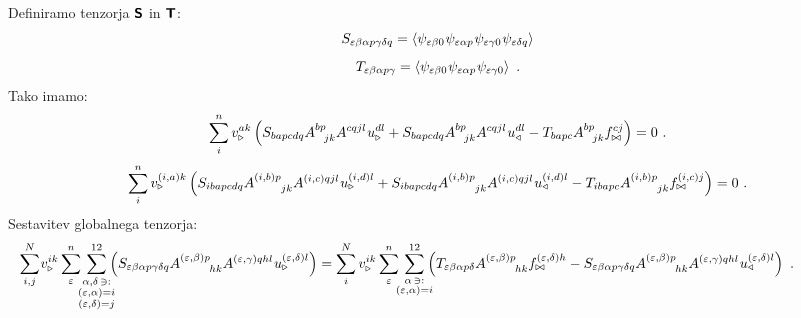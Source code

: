 Definiramo tenzorja $\bm{\mathsf{S}}$ in $\bm{\mathsf{T}}$:
\begin{equation}
   S_{\varepsilon \beta \alpha p \gamma \delta q} = \left\langle   \psi_{ \varepsilon \beta 0} \mkern1mu    \psi_{\varepsilon \alpha p} \mkern1mu    \psi_{\varepsilon \gamma 0} \mkern1mu    \psi_{\varepsilon \delta q}   \right\rangle
\end{equation}
\begin{equation}
   T_{\varepsilon \beta \alpha p \gamma} = \left\langle \psi_{ \varepsilon \beta 0} \mkern1mu    \psi_{\varepsilon \alpha p} \mkern1mu    \psi_{\varepsilon \gamma 0}    \right\rangle \ .
\end{equation}
Tako imamo:
\begin{equation}
   \sum^n_i v^{ak}_{\triangleright} \left(
   S_{bapcdq} A^{bp}_{\mkern14mu jk} A^{cqjl} \mkern1mu u^{dl}_\triangleright
   +
   S_{bapcdq} A^{bp}_{\mkern14mu jk} A^{cqjl} \mkern1mu u^{dl}_\triangleleft
   -
   T_{bapc} A^{bp}_{\mkern14mu jk} f^{cj}_{\bowtie}
   \right) = 0 \ .
\end{equation}
\begin{equation*}
   \sum^n_i v^{(i,a)k}_{\triangleright} \left(
   S_{ibapcdq} A^{(i,b)p}_{\mkern42mu jk} A^{(i,c)qjl} \mkern1mu u^{(i,d)l}_\triangleright
   +
   S_{ibapcdq} A^{(i,b)p}_{\mkern42mu jk} A^{(i,c)qjl} \mkern1mu u^{(i,d)l}_\triangleleft
   -
   T_{ibapc} A^{(i,b)p}_{\mkern42mu jk} f^{(i,c)j}_{\bowtie}
   \right) = 0 \ .
\end{equation*}
Sestavitev globalnega tenzorja:
\begin{equation*}
   \mkern-80mu
   \sum^N_{i,j} \mkern-2mu v^{i k}_{\triangleright}
   \sum^n_\varepsilon
   \mkern-7mu
   \sum_{\substack{\alpha, \delta \, \ni: \\ (\varepsilon,\alpha) = i \\ (\varepsilon,\delta) = j}}^{12}
   \mkern-10mu
   \left(
   S_{\varepsilon \beta \alpha p \gamma \delta q}
   A^{(\varepsilon,\beta) p}_{\mkern46mu hk}
   A^{(\varepsilon,\gamma) qhl}
   \mkern1mu
   u^{(\varepsilon,\delta) l}_\triangleright \right)
   =
   \sum^N_i v^{i k}_{\triangleright}
   \sum^n_\varepsilon
   \mkern-7mu
   \sum_{\substack{\alpha \, \ni: \\ (\varepsilon,\alpha) = i}}^{12}
   \mkern-10mu
   \left(
   T_{\varepsilon \beta \alpha p \delta}
   A^{(\varepsilon,\beta) p}_{\mkern46mu hk}
   f^{(\varepsilon,\delta) h}_{\bowtie}
   -
   S_{\varepsilon \beta \alpha p \gamma \delta q}
   A^{(\varepsilon,\beta) p}_{\mkern46mu hk}
   A^{(\varepsilon,\gamma) qhl}
   \mkern1mu
   u^{(\varepsilon,\delta) l}_\triangleleft \right) \ .
\end{equation*}
